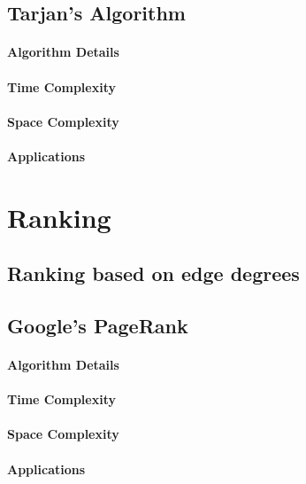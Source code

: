 \documentclass[12pt]{article}
\begin{document}
\subsection{Tarjan's Algorithm}
\paragraph{Algorithm Details}
\paragraph{Time Complexity}
\paragraph{Space Complexity}
\paragraph{Applications}

\section{Ranking}
\subsection{Ranking based on edge degrees}

\subsection{Google's PageRank}
\paragraph{Algorithm Details}
\paragraph{Time Complexity}
\paragraph{Space Complexity}
\paragraph{Applications}
\end{document}
